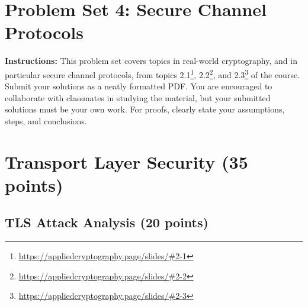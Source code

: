 \documentclass[10pt,a4paper,american]{article}
\begin{document}
\classhandoutheader

\section*{Problem Set 4: Secure Channel Protocols}

\begin{tcolorbox}[colframe=OliveGreen!30!white,colback=OliveGreen!5!white]
	\textbf{Instructions:} This problem set covers topics in real-world cryptography, and in particular secure channel protocols, from topics 2.1\footnote{\url{https://appliedcryptography.page/slides/\#2-1}}, 2.2\footnote{\url{https://appliedcryptography.page/slides/\#2-2}}, and 2.3\footnote{\url{https://appliedcryptography.page/slides/\#2-3}} of the course. Submit your solutions as a neatly formatted PDF. You are encouraged to collaborate with classmates in studying the material, but your submitted solutions must be your own work. For proofs, clearly state your assumptions, steps, and conclusions.
\end{tcolorbox}

\section{Transport Layer Security (35 points)}

\subsection{TLS Attack Analysis (20 points)}
\end{document}
